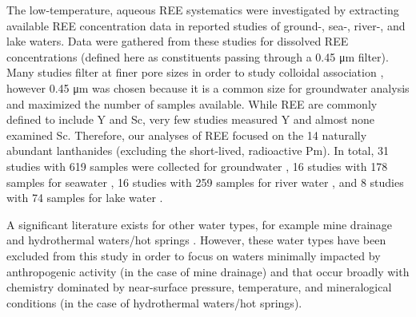 The low-temperature, aqueous REE systematics were investigated by extracting available REE concentration data in reported studies of ground-, sea-, river-, and lake waters.
Data were gathered from these studies for dissolved REE concentrations (defined here as constituents passing through a 0.45 \si{\um} filter). 
Many studies filter at finer pore sizes in order to study colloidal association \citep{Dia_GCA_2000, Pourret_JCIS_2007, Stolpe_GCA_2013},
however 0.45 \si{\um} was chosen because it is a common size for groundwater analysis and  maximized the number of samples available.
While REE are commonly defined to include Y and Sc, very few studies measured Y and almost none examined Sc.
Therefore, our analyses of REE focused on the 14 naturally abundant lanthanides (excluding the short-lived, radioactive Pm).
In total, 31 studies with 619 samples were collected for groundwater
\citep{Choi_CG_2009, BwireOjiambo_AG_2003, Siebert_AG_2012, Dia_GCA_2000, Gruau_WR_2004, Pourret_AG_2010, Johannesson_GCA_1999, Johannesson_CG_2000, Tang_CG_2006, Willis_CG_2011, Tweed_CG_2006, Johannesson_GCA_2000, Duncan_AG_2003, Smedley_GCA_1991, Gosselin_GCA_1992, Tricca_CG_1999, Johannesson_CG_1996, Michard_GCA_1987, Janssen_WR_2003, Worrall_AG_2001, Yan_CG_2001, Moller_AG_1998, Guo_CG_2010, Johannesson_AG_1995, Leybourne_AG_2000, deBoer_WR_1996, Miekeley_JGE_1992, Negrel_AG_2000, E-V_EES_2012, Otsuka_GJ_2003, Nelson_GEEA_2004},
16 studies with 178 samples for seawater
\citep{DeBaar_Nat_1983, Duncan_AG_2003, Alibo_GCA_1999, Bau_MC_1997, Elderfield_Nat_1982, Elderfield_GCA_1990, Fu_Tal_2007, Haley_MC_2003, Hirata_Tal_2002, Nozaki_GCA_1999, Piepgras_GCA_1992, Schijf_GCA_1995, Sholkovitz_GCA_1994, Vicente_SAB_1998, Zhu_JAC_2006, Nozaki_GCA_2000},
16 studies with 259 samples for river water
\citep{Hannigan_CG_2001, BwireOjiambo_AG_2003, Tricca_CG_1999, Elderfield_GCA_1990, Nozaki_GCA_1999, Astrom_WR_2003, Biddau_CG_2002, Centeno_AG_2004, Gammons_GCA_2005, Gammons_CG_2005, Han_AG_2007, Ingri_CG_2000, Johannesson_CG_2004, Lawrence_AG_2006, Sholkovitz_EPSL_1992, Tang_GCA_2003, Zhang_AG_1998},
and 8 studies with 74 samples for lake water
\citep{BwireOjiambo_AG_2003, Johannesson_AG_1995, Leybourne_AG_2000, Gammons_CG_2005, Johannesson_CG_2004, DeCarlo_GCA_2002, Johannesson_LO_1994, Johannesson_CG_1995}.

A significant literature exists for other water types, for example mine drainage \citep{Borrego_HR_2012, Bozau_AG_2004, Doulati_JEE_2013, Romero_AG_2010, Verplank_AG_2004, Worrall_GCA_2001, Zhao_IJCG_2007} and hydrothermal waters/hot springs \citep{Haas_GCA_1995, Lepel_conf_1988, Michard_GCA_1989, Lewis_GCA_1997, Lewis_GCA_1998, Sanada_Geotherm_2006}.
However, these water types have been excluded from this study in order to focus on waters minimally impacted by anthropogenic activity (in the case of mine drainage) and that occur broadly with chemistry dominated by near-surface pressure, temperature, and mineralogical conditions (in the case of hydrothermal waters/hot springs).

